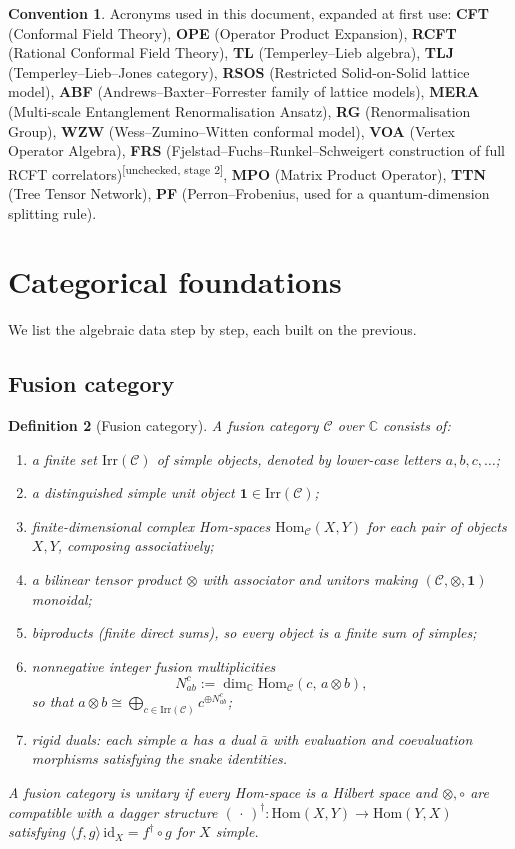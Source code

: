 \documentclass[11pt,a4paper]{article}
\newtheorem{definition}{Definition}[section]
\theoremstyle{definition}
\newtheorem{convention}[definition]{Convention}
\newcommand{\Cc}{\mathcal{C}}
\newcommand{\Irr}{\mathrm{Irr}}
\newcommand{\Hom}{\mathrm{Hom}}
\newcommand{\id}{\mathrm{id}}
\newcommand{\one}{\mathbf{1}}
\newcommand{\unchecked}{\textsuperscript{\textcolor{red!70!black}{[unchecked, stage 2]}}}
\begin{document}
\begin{convention}\label{conv:acro}
Acronyms used in this document, expanded at first use:
\textbf{CFT} (Conformal Field Theory),
\textbf{OPE} (Operator Product Expansion),
\textbf{RCFT} (Rational Conformal Field Theory),
\textbf{TL} (Temperley--Lieb algebra),
\textbf{TLJ} (Temperley--Lieb--Jones category),
\textbf{RSOS} (Restricted Solid-on-Solid lattice model),
\textbf{ABF} (Andrews--Baxter--Forrester family of lattice models),
\textbf{MERA} (Multi-scale Entanglement Renormalisation Ansatz),
\textbf{RG} (Renormalisation Group),
\textbf{WZW} (Wess--Zumino--Witten conformal model),
\textbf{VOA} (Vertex Operator Algebra),
\textbf{FRS} (Fjelstad--Fuchs--Runkel--Schweigert construction of full RCFT
correlators)\unchecked,
\textbf{MPO} (Matrix Product Operator),
\textbf{TTN} (Tree Tensor Network),
\textbf{PF} (Perron--Frobenius, used for a quantum-dimension splitting rule).
\end{convention}

\section{Categorical foundations}

We list the algebraic data step by step, each built on the previous.

\subsection{Fusion category}

\begin{definition}[Fusion category]\label{def:fuscat}
A \emph{fusion category} $\Cc$ over $\mathbb{C}$ consists of:
\begin{enumerate}[label=(\roman*)]
\item a finite set $\Irr(\Cc)$ of \emph{simple objects}, denoted by lower-case
      letters $a,b,c,\dots$;
\item a distinguished simple \emph{unit object} $\one \in \Irr(\Cc)$;
\item finite-dimensional complex \emph{Hom-spaces} $\Hom_\Cc(X,Y)$ for each
      pair of objects $X,Y$, composing associatively;
\item a bilinear \emph{tensor product} $\otimes$ with associator and unitors
      making $(\Cc,\otimes,\one)$ monoidal;
\item \emph{biproducts} (finite direct sums), so every object is a finite
      sum of simples;
\item nonnegative integer \emph{fusion multiplicities}
      \[ N_{ab}^{c} := \dim_{\mathbb{C}}\Hom_\Cc(c,\,a\otimes b), \]
      so that $a\otimes b \cong \bigoplus_{c\in\Irr(\Cc)} c^{\oplus N_{ab}^c}$;
\item rigid duals: each simple $a$ has a dual $\bar a$ with evaluation and
      coevaluation morphisms satisfying the snake identities.
\end{enumerate}
A fusion category is \emph{unitary} if every Hom-space is a Hilbert space and
$\otimes,\circ$ are compatible with a dagger structure
$(\,\cdot\,)^\dagger:\Hom(X,Y)\to\Hom(Y,X)$ satisfying $\langle f,g\rangle
\,\id_X = f^\dagger\circ g$ for $X$ simple.
\end{definition}
\end{document}

